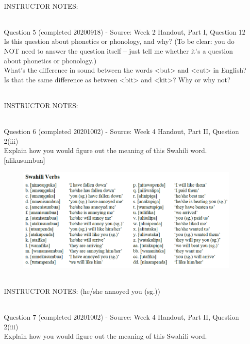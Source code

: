 \documentclass[12pt]{article}
\begin{document}
~\\
INSTRUCTOR NOTES: 


~\\

{\large Question 5} (completed 20200918) - Source: Week 2 Handout, Part I, Question 12\\

Is this question about phonetics or phonology, and why? (To be clear: you do NOT need to answer the question itself -- just tell me whether it's a question about phonetics or phonology.)\\

What’s the difference in sound between the words <but> and <cut> in English? Is that the same difference as between <bit> and <kit>? Why or why not?


~\\
INSTRUCTOR NOTES: 


~\\

{\large Question 6} (completed 20201002) - Source: Week 4 Handout, Part II, Question 2(iii)\\

Explain how you would figure out the meaning of this Swahili word.\\

{[alikusumbua]}

\begin{figure}[H]
\includegraphics{../images/swahiliverbs.png}
\end{figure}

~\\
INSTRUCTOR NOTES: (he/she annoyed you (sg.))


~\\

{\large Question 7} (completed 20201002) - Source: Week 4 Handout, Part II, Question 2(iii)\\

Explain how you would figure out the meaning of this Swahili word.\\
\end{document}
